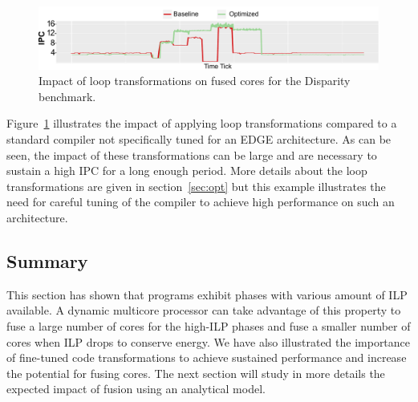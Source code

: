 \begin{figure}[t]
    \includegraphics[width=\textwidth]{graphics/motivation/code_opt_3.pdf}
\vspace*{-5mm}
    \caption{Impact of loop transformations on fused cores for the Disparity benchmark.} 
    \label{fig:compmotiv}
\vspace{2mm}
\end{figure}
Figure~\ref{fig:compmotiv} illustrates the impact of applying loop transformations compared to a standard compiler not specifically tuned for an EDGE architecture.
As can be seen, the impact of these transformations can be large and are necessary to sustain a high IPC for a long enough period.
More details about the loop transformations are given in section~\ref{sec:opt} but this example illustrates the need for careful tuning of the compiler to achieve high performance on such an architecture.

\subsection{Summary}
This section has shown that programs exhibit phases with various amount of ILP available.
A dynamic multicore processor can take advantage of this property to fuse a large number of cores for the high-ILP phases and fuse a smaller number of cores when ILP drops to conserve energy.
We have also illustrated the importance of fine-tuned code transformations to achieve sustained performance and increase the potential for fusing cores.
The next section will study in more details the expected impact of fusion using an analytical model.

